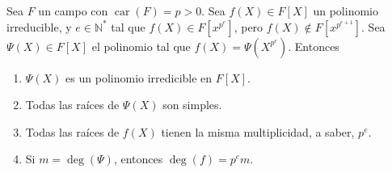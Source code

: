 \documentclass[12pt]{report}
\theoremstyle{largebreak}
\DeclareMathOperator{\car}{car}
\begin{document}
    \begin{theor}
        Sea $F$ un campo con $\car(F)=p>0$. Sea $f(X)\in F[X]$ un polinomio irreducible, y $e\in\mathbb{N}^{*}$ tal que $f(X)\in F[x^{p^e}]$, pero $f(X)\notin F[x^{p^{e+1}}]$. Sea $\Psi(X)\in F[X]$ el polinomio tal que $f(X)=\Psi(X^{p^e})$. Entonces
        \begin{enumerate}
            \item $\Psi(X)$ es un polinomio irredicible en $F[X]$.\label{T_1_1_1}
            \item Todas las raíces de $\Psi(X)$ son simples.\label{T_1_1_2}
            \item Todas las raíces de $f(X)$ tienen la misma multiplicidad, a saber, $p^e$.\label{T_1_1_3}
            \item Si $m=\deg(\Psi)$, entonces $\deg(f)=p^em$.\label{T_1_1_4}
        \end{enumerate}
    \end{theor}
\end{document}
